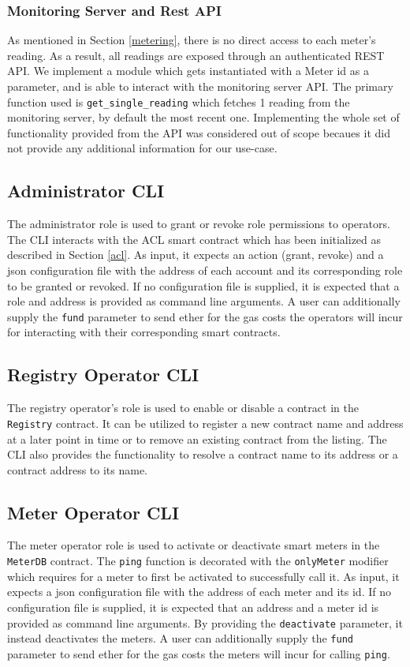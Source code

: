 \subsubsection*{Monitoring Server and Rest API}
As mentioned in Section \ref{metering}, there is no direct access to each meter's reading. As a result, all readings are exposed through an authenticated REST API. We implement a module which gets instantiated with a Meter id as a parameter, and is able to interact with the monitoring server API. The primary function used is \texttt{get\_single\_reading} which fetches 1 reading from the monitoring server, by default the most recent one. Implementing the whole set of functionality provided from the API was considered out of scope becaues it did not provide any additional information for our use-case.

\subsection{Administrator CLI}
The administrator role is used to grant or revoke role permissions to operators. The CLI interacts with the ACL smart contract which has been initialized as described in Section \ref{acl}.  As input, it expects an action (grant, revoke) and a json configuration file with the address of each account and its corresponding role to be granted or revoked. If no configuration file is supplied, it is expected that a role and address is provided as command line arguments. A user can additionally supply the \texttt{fund} parameter to send ether for the gas costs the operators will incur for interacting with their corresponding smart contracts. 

\subsection{Registry Operator CLI}
The registry operator's role is used to enable or disable a contract in the \texttt{Registry} contract. It can be utilized to register a new contract name and address at a later point in time or to remove an existing contract from the listing. The CLI also provides the functionality to resolve a contract name to its address or a contract address to its name. 

\subsection{Meter Operator CLI} \label{meter-operator}
The meter operator role is used to activate or deactivate smart meters in the \texttt{MeterDB} contract. The \texttt{ping} function is decorated with the \texttt{onlyMeter} modifier which requires for a meter to first be activated to successfully call it. As input, it expects a json configuration file with the address of each meter and its id. If no configuration file is supplied, it is expected that an address and a meter id is provided as command line arguments. By providing the \texttt{deactivate} parameter, it instead deactivates the meters. A user can additionally supply the \texttt{fund} parameter to send ether for the gas costs the meters will incur for calling \texttt{ping}.

